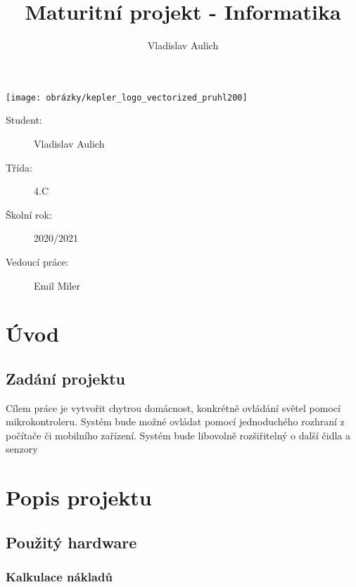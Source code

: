 \documentclass[a4paper,titlepage]{article}
\title{Maturitní projekt - Informatika}
\author{Vladislav Aulich}
\begin{document}
\maketitle
\begin{center}
	\texttt{[image: obrázky/kepler\_logo\_vectorized\_pruhl200]}
\end{center}

\begin{description}
	\item [Student:] Vladislav Aulich%
	\item [Třída:] 4.C %
	\item [Školní rok:] 2020/2021
	\item [Vedoucí práce:] Emil Miler %
\end{description}

\maketitle
\tableofcontents
\newpage

\section{Úvod}

\subsection{Zadání projektu}

Cílem práce je vytvořit chytrou domácnost, konkrétně ovládání světel pomocí
mikrokontroleru. Systém bude možné ovládat pomocí jednoduchého rozhraní
z počítače či mobilního zařízení. Systém bude libovolně rozšiřitelný o další čidla
a senzory

\section{Popis projektu}

\subsection{Použitý hardware}

\subsubsection{Kalkulace nákladů}
\end{document}
